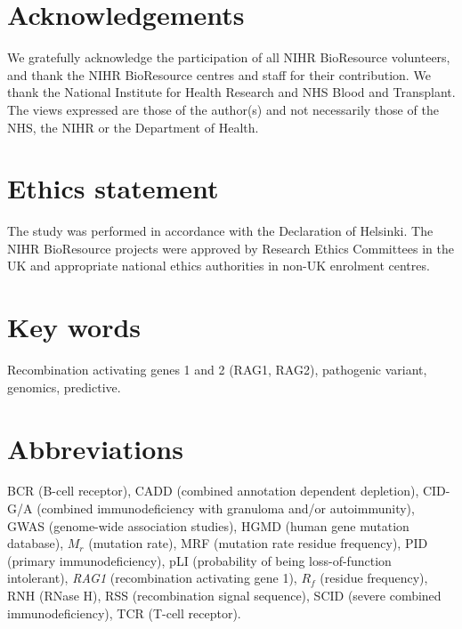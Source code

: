 \documentclass[preprint,11pt,fleqn]{elsarticle}
\begin{document}
\section*{Acknowledgements}
\noindent We gratefully acknowledge the participation of all NIHR BioResource volunteers, and thank the NIHR BioResource centres and staff for their contribution.
We thank the National Institute for Health Research and NHS Blood and Transplant.
The views expressed are those of the author(s) and not necessarily those of the NHS, the NIHR or the Department of Health.

\section*{Ethics statement}
\noindent The study was performed in accordance with the Declaration of Helsinki.
The NIHR BioResource projects were approved by Research Ethics Committees in the UK and appropriate national ethics authorities in non-UK enrolment centres.

\section*{Key words}
\noindent Recombination activating genes 1 and 2 (RAG1, RAG2), pathogenic variant, genomics, predictive.

\section*{Abbreviations}
\noindent 
BCR (B-cell receptor),
CADD (combined annotation dependent depletion),
CID-G/A (combined immunodeficiency with granuloma and/or autoimmunity),
GWAS (genome-wide association studies),
HGMD (human gene mutation database),
${M}_{r}$ (mutation rate),
MRF (mutation rate residue frequency),
PID (primary immunodeficiency),
pLI (probability of being loss-of-function intolerant),
\textit{RAG1} (recombination activating gene 1),
${R}_{f}$ (residue frequency),
RNH (RNase H),
RSS (recombination signal sequence),
SCID (severe combined immunodeficiency),
TCR (T-cell receptor).
\pagebreak

\end{document}

